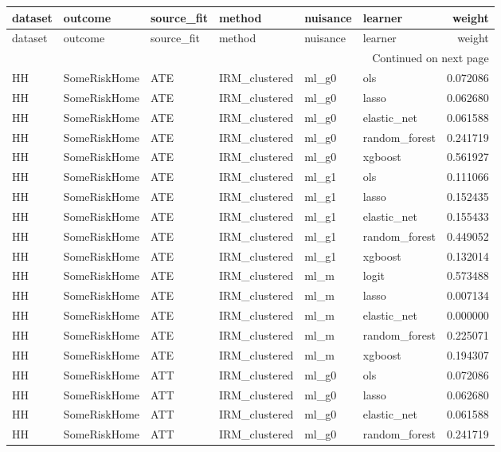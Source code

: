 \begin{longtable}{llllllr}
\toprule
dataset & outcome & source\_fit & method & nuisance & learner & weight \\
\midrule
\endfirsthead
\toprule
dataset & outcome & source\_fit & method & nuisance & learner & weight \\
\midrule
\endhead
\midrule
\multicolumn{7}{r}{Continued on next page} \\
\midrule
\endfoot
\bottomrule
\endlastfoot
HH & SomeRiskHome & ATE & IRM\_clustered & ml\_g0 & ols & 0.072086 \\
HH & SomeRiskHome & ATE & IRM\_clustered & ml\_g0 & lasso & 0.062680 \\
HH & SomeRiskHome & ATE & IRM\_clustered & ml\_g0 & elastic\_net & 0.061588 \\
HH & SomeRiskHome & ATE & IRM\_clustered & ml\_g0 & random\_forest & 0.241719 \\
HH & SomeRiskHome & ATE & IRM\_clustered & ml\_g0 & xgboost & 0.561927 \\
HH & SomeRiskHome & ATE & IRM\_clustered & ml\_g1 & ols & 0.111066 \\
HH & SomeRiskHome & ATE & IRM\_clustered & ml\_g1 & lasso & 0.152435 \\
HH & SomeRiskHome & ATE & IRM\_clustered & ml\_g1 & elastic\_net & 0.155433 \\
HH & SomeRiskHome & ATE & IRM\_clustered & ml\_g1 & random\_forest & 0.449052 \\
HH & SomeRiskHome & ATE & IRM\_clustered & ml\_g1 & xgboost & 0.132014 \\
HH & SomeRiskHome & ATE & IRM\_clustered & ml\_m & logit & 0.573488 \\
HH & SomeRiskHome & ATE & IRM\_clustered & ml\_m & lasso & 0.007134 \\
HH & SomeRiskHome & ATE & IRM\_clustered & ml\_m & elastic\_net & 0.000000 \\
HH & SomeRiskHome & ATE & IRM\_clustered & ml\_m & random\_forest & 0.225071 \\
HH & SomeRiskHome & ATE & IRM\_clustered & ml\_m & xgboost & 0.194307 \\
HH & SomeRiskHome & ATT & IRM\_clustered & ml\_g0 & ols & 0.072086 \\
HH & SomeRiskHome & ATT & IRM\_clustered & ml\_g0 & lasso & 0.062680 \\
HH & SomeRiskHome & ATT & IRM\_clustered & ml\_g0 & elastic\_net & 0.061588 \\
HH & SomeRiskHome & ATT & IRM\_clustered & ml\_g0 & random\_forest & 0.241719 \\

\end{longtable}
